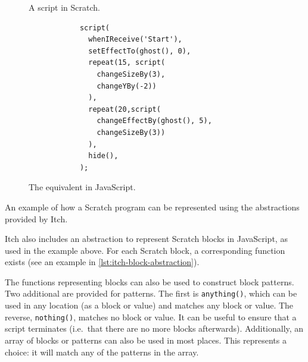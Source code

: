 \documentclass[../main]{subfiles}
\begin{document}
\begin{listing}
    \begin{wide}
        \begin{subfigure}{0.49\linewidth}
            \begin{scratch}[scale=0.8]
                {
                }
                {
                }

            \end{scratch}
            \caption{A script in Scratch.}
        \end{subfigure}
        \begin{subfigure}{0.5\linewidth}
            \begin{verbatim}
            script(
              whenIReceive('Start'),
              setEffectTo(ghost(), 0),
              repeat(15, script(
                changeSizeBy(3),
                changeYBy(-2))
              ),
              repeat(20,script(
                changeEffectBy(ghost(), 5),
                changeSizeBy(3))
              ),
              hide(),
            );
            \end{verbatim}
            \caption{The equivalent in JavaScript.}
        \end{subfigure}
    \end{wide}
    \caption{An example of how a Scratch program can be represented using the abstractions provided by Itch.}\label{lst:itch-block-abstraction}
\end{listing}

Itch also includes an abstraction to represent Scratch blocks in JavaScript, as used in the example above.
For each Scratch block, a corresponding function exists (see an example in \cref{lst:itch-block-abstraction}).

The functions representing blocks can also be used to construct block patterns.
Two additional are provided for patterns.
The first is \texttt{anything()}, which can be used in any location (as a block or value) and matches any block or value.
The reverse, \texttt{nothing()}, matches no block or value.
It can be useful to ensure that a script terminates (i.e.\ that there are no more blocks afterwards).
Additionally, an array of blocks or patterns can also be used in most places.
This represents a choice: it will match any of the patterns in the array.
\end{document}
